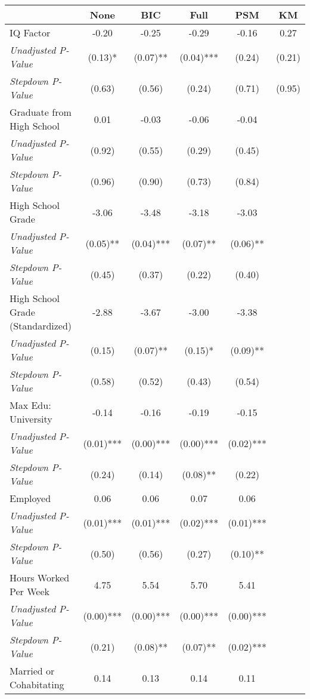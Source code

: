 \begin{tabular}{l c c c c c}
\toprule
 & None & BIC & Full & PSM & KM \\
\midrule
IQ Factor & -0.20 & -0.25 & -0.29 & -0.16 & 0.27 \\
\quad \textit{Unadjusted P-Value} & (0.13)* & (0.07)** & (0.04)*** & (0.24) & (0.21) \\
\quad \textit{Stepdown P-Value} & (0.63) & (0.56) & (0.24) & (0.71) & (0.95) \\
Graduate from High School & 0.01 & -0.03 & -0.06 & -0.04 & \\
\quad \textit{Unadjusted P-Value} & (0.92) & (0.55) & (0.29) & (0.45) & \\
\quad \textit{Stepdown P-Value} & (0.96) & (0.90) & (0.73) & (0.84) & \\
High School Grade & -3.06 & -3.48 & -3.18 & -3.03 & \\
\quad \textit{Unadjusted P-Value} & (0.05)** & (0.04)*** & (0.07)** & (0.06)** & \\
\quad \textit{Stepdown P-Value} & (0.45) & (0.37) & (0.22) & (0.40) & \\
High School Grade (Standardized) & -2.88 & -3.67 & -3.00 & -3.38 & \\
\quad \textit{Unadjusted P-Value} & (0.15) & (0.07)** & (0.15)* & (0.09)** & \\
\quad \textit{Stepdown P-Value} & (0.58) & (0.52) & (0.43) & (0.54) & \\
Max Edu: University & -0.14 & -0.16 & -0.19 & -0.15 & \\
\quad \textit{Unadjusted P-Value} & (0.01)*** & (0.00)*** & (0.00)*** & (0.02)*** & \\
\quad \textit{Stepdown P-Value} & (0.24) & (0.14) & (0.08)** & (0.22) & \\
Employed & 0.06 & 0.06 & 0.07 & 0.06 & \\
\quad \textit{Unadjusted P-Value} & (0.01)*** & (0.01)*** & (0.02)*** & (0.01)*** & \\
\quad \textit{Stepdown P-Value} & (0.50) & (0.56) & (0.27) & (0.10)** & \\
Hours Worked Per Week & 4.75 & 5.54 & 5.70 & 5.41 & \\
\quad \textit{Unadjusted P-Value} & (0.00)*** & (0.00)*** & (0.00)*** & (0.00)*** & \\
\quad \textit{Stepdown P-Value} & (0.21) & (0.08)** & (0.07)** & (0.02)*** & \\
Married or Cohabitating & 0.14 & 0.13 & 0.14 & 0.11 & \\

\end{tabular}
